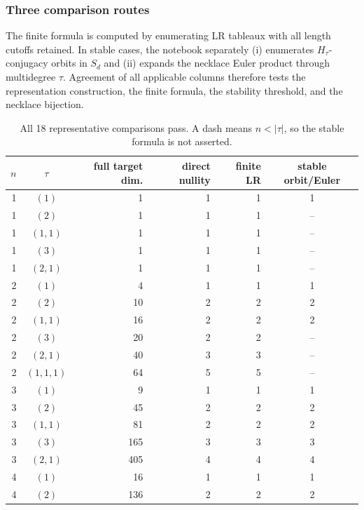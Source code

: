 \documentclass[10pt]{article}
\begin{document}
\subsubsection*{Three comparison routes}
The finite formula is computed by enumerating LR tableaux with all length
cutoffs retained.  In stable cases, the notebook separately (i) enumerates
$H_\tau$-conjugacy orbits in $S_d$ and (ii) expands the necklace Euler product
through multidegree $\tau$.  Agreement of all applicable columns therefore
tests the representation construction, the finite formula, the stability
threshold, and the necklace bijection.

\begin{table}[ht]
\centering
\small
\setlength{\tabcolsep}{5.3pt}
\begin{tabular}{@{}r c r r r c@{}}
\toprule
$n$ & $\tau$ & full target dim. & direct nullity & finite LR & stable orbit/Euler \\
\midrule
1 & $(1)$       & 1   & 1 & 1 & 1 \\
1 & $(2)$       & 1   & 1 & 1 & -- \\
1 & $(1,1)$     & 1   & 1 & 1 & -- \\
1 & $(3)$       & 1   & 1 & 1 & -- \\
1 & $(2,1)$     & 1   & 1 & 1 & -- \\
2 & $(1)$       & 4   & 1 & 1 & 1 \\
2 & $(2)$       & 10  & 2 & 2 & 2 \\
2 & $(1,1)$     & 16  & 2 & 2 & 2 \\
2 & $(3)$       & 20  & 2 & 2 & -- \\
2 & $(2,1)$     & 40  & 3 & 3 & -- \\
2 & $(1,1,1)$   & 64  & 5 & 5 & -- \\
3 & $(1)$       & 9   & 1 & 1 & 1 \\
3 & $(2)$       & 45  & 2 & 2 & 2 \\
3 & $(1,1)$     & 81  & 2 & 2 & 2 \\
3 & $(3)$       & 165 & 3 & 3 & 3 \\
3 & $(2,1)$     & 405 & 4 & 4 & 4 \\
4 & $(1)$       & 16  & 1 & 1 & 1 \\
4 & $(2)$       & 136 & 2 & 2 & 2 \\
\bottomrule
\end{tabular}
\caption{All 18 representative comparisons pass.  A dash means $n<|\tau|$,
so the stable formula is not asserted.}
\label{unitary-conjugation-proof-and-verification:tab:checks}
\end{table}
\end{document}
